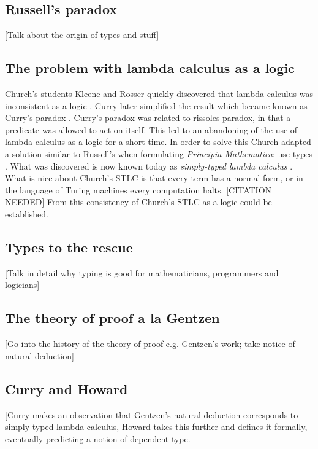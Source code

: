 \subsection{Russell's paradox}

[Talk about the origin of types and stuff]

\subsection{The problem with lambda calculus as a logic}

Church's students Kleene and Rosser quickly discovered that lambda calculus was inconsistent as a logic \cite{kleene1935c}. Curry later simplified the result which became known as Curry's paradox \cite{curry1942}. Curry's paradox was related to rissoles paradox, in that a predicate was allowed to act on itself. This led to an abandoning of the use of lambda calculus as a logic for a short time. In order to solve this Church adapted a solution similar to Russell's when formulating \emph{Principia Mathematica}: use types \cite{PrincipiaMathematicaVolumeI}. What was discovered is now known today as \emph{simply-typed lambda calculus} \cite{church1940}. What is nice about Church's STLC is that every term has a normal form, or in the language of Turing machines every computation halts. \cite{turing1936a} [CITATION NEEDED] From this consistency of Church's STLC as a logic could be established.

\subsection{Types to the rescue}

[Talk in detail why typing is good for mathematicians, programmers and logicians]

\subsection{The theory of proof a la Gentzen}

[Go into the history of the theory of proof e.g. Gentzen's work; take notice of natural deduction]

\subsection{Curry and Howard}

[Curry makes an observation that Gentzen's natural deduction corresponds to simply typed lambda calculus, Howard takes this further and defines it formally, eventually predicting a notion of dependent type.

